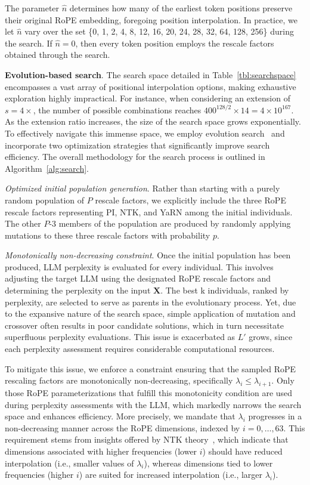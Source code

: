 The parameter $\hat{n}$ determines how many of the earliest token positions preserve their original RoPE embedding, foregoing position interpolation. In practice, we let $\hat{n}$ vary over the set \{0, 1, 2, 4, 8, 12, 16, 20, 24, 28, 32, 64, 128, 256\} during the search. If $\hat{n}=0$, then every token position employs the rescale factors obtained through the search.

\textbf{Evolution-based search}. The search space detailed in Table~\ref{tbl:searchspace} encompasses a vast array of positional interpolation options, making exhaustive exploration highly impractical. For instance, when considering an extension of $s=4\times$, the number of possible combinations reaches $400^{128/2}\times14=4\times10^{167}$. As the extension ratio increases, the size of the search space grows exponentially. To effectively navigate this immense space, we employ evolution search~\cite{guo2020single} and incorporate two optimization strategies that significantly improve search efficiency. The overall methodology for the search process is outlined in Algorithm~\ref{alg:search}.

\textit{Optimized initial population generation}. Rather than starting with a purely random population of $P$ rescale factors, we explicitly include the three RoPE rescale factors representing PI, NTK, and YaRN among the initial individuals. The other $P$-3 members of the population are produced by randomly applying mutations to these three rescale factors with probability $p$.

\textit{Monotonically non-decreasing constraint}. Once the initial population has been produced, LLM perplexity is evaluated for every individual. This involves adjusting the target LLM using the designated RoPE rescale factors and determining the perplexity on the input $\mathbf{X}$. The best k individuals, ranked by perplexity, are selected to serve as parents in the evolutionary process. Yet, due to the expansive nature of the search space, simple application of mutation and crossover often results in poor candidate solutions, which in turn necessitate superfluous perplexity evaluations. This issue is exacerbated as $L'$ grows, since each perplexity assessment requires considerable computational resources.

To mitigate this issue, we enforce a constraint ensuring that the sampled RoPE rescaling factors are monotonically non-decreasing, specifically $\lambda_i\le \lambda_{i+1}$. Only those RoPE parameterizations that fulfill this monotonicity condition are used during perplexity assessments with the LLM, which markedly narrows the search space and enhances efficiency. More precisely, we mandate that $\lambda_i$ progresses in a non-decreasing manner across the RoPE dimensions, indexed by $i = 0, \ldots, 63$. This requirement stems from insights offered by NTK theory~\cite{jacot2018neural,tancik2020fourier,ntk}, which indicate that dimensions associated with higher frequencies (lower $i$) should have reduced interpolation (i.e., smaller values of $\lambda_i$), whereas dimensions tied to lower frequencies (higher $i$) are suited for increased interpolation (i.e., larger $\lambda_i$).

